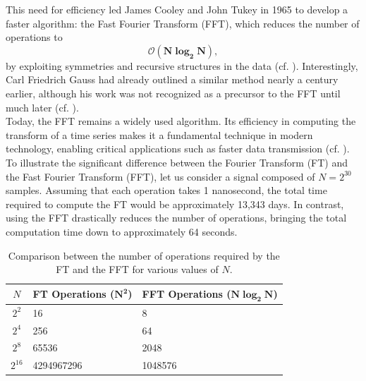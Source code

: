 \documentclass[11pt]{article}
\theoremstyle{definition}
\theoremstyle{remark}
\numberwithin{equation}{section}
\begin{document}
This need for efficiency led James Cooley and John Tukey in 1965 to develop a faster algorithm: the Fast Fourier Transform (FFT), which reduces the number of operations to
\[
\boldsymbol{\mathcal{O}(N \log_2 N),}
\]
by exploiting symmetries and recursive structures in the data (cf. \cite{Cooley-Tukey,FFThistorical}). Interestingly, Carl Friedrich Gauss had already outlined a similar method nearly a century earlier, although his work was not recognized as a precursor to the FFT until much later (cf. \cite{GAUSS}).\\%


Today, the FFT remains a widely used algorithm. Its efficiency in computing the transform of a time series makes it a fundamental technique in modern technology, enabling critical applications such as faster data transmission (cf. \cite{whatistheFFT}).\\%

To illustrate the significant difference between the Fourier Transform (FT) and the Fast Fourier Transform (FFT), let us consider a signal composed of $N = 2^{30}$ samples. Assuming that each operation takes 1 nanosecond, the total time required to compute the FT would be approximately 13,343 days. In contrast, using the FFT drastically reduces the number of operations, bringing the total computation time down to approximately 64 seconds.
\begin{table}[H]
    \centering
     \caption{Comparison between the number of operations required by the FT and the FFT for various values of \( N \).}
    \begin{tabularx}{\textwidth}{|c|X|X|}
        \hline \rowcolor{red!15} %
        \textbf{\( N \)} & \textbf{ \textbf{FT Operations ($\boldsymbol{N^2}$)}} & \textbf{\textbf{FFT Operations ($\boldsymbol{N \log _2N}$)}} \\
        \hline
        \rowcolor{gray!10} \( 2^2 \) & 16 & 8  \\
        \( 2^4 \) & 256 & 64 \\
        \rowcolor{gray!10} \( 2^8 \) & 65536 & 2048  \\
        \( 2^{16} \) & 4294967296 & 1048576 \\
        \hline
    \end{tabularx}
\end{table}
\end{document}
